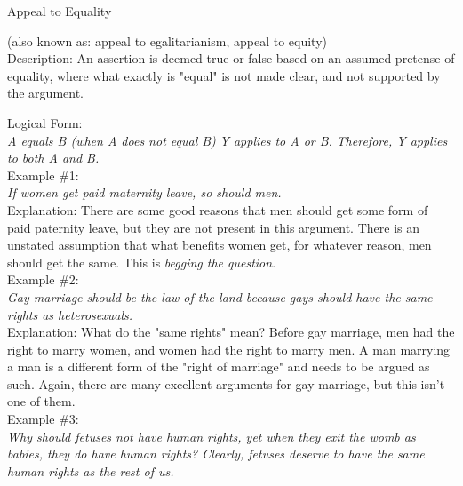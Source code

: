 \documentclass[a4paper,12pt,single,pdftex]{scrbook}
\begin{document}
Appeal to Equality
    
      (also known as: appeal to egalitarianism, appeal to equity)
    \\

  
    Description: An assertion is deemed true or false based on an assumed pretense of equality, where what exactly is "equal" is not made clear, and not supported by the argument.

    
      Logical Form:
    \\

    
      {\em A equals B (when A does not equal B)} \newline
{\em Y applies to A or B.} \newline
{\em Therefore, Y applies to both A and B.}
    \\

    
      Example \#1:
    \\

    
      {\em If women get paid maternity leave, so should men.}
    \\

    
      Explanation: There are some good reasons that men should get some form of paid paternity leave, but they are not present in this argument. There is an unstated assumption that what benefits women get, for whatever reason, men should get the same. This is {\it begging the question}.
    \\

    
      Example \#2:
    \\

    
      {\em Gay marriage should be the law of the land because gays should have the same rights as heterosexuals.}
    \\

    
      Explanation: What do the "same rights" mean? Before gay marriage, men had the right to marry women, and women had the right to marry men. A man marrying a man is a different form of the "right of marriage" and needs to be argued as such. Again, there are many excellent arguments for gay marriage, but this isn't one of them.
    \\

    
      Example \#3:
    \\

    
      {\em Why should fetuses not have human rights, yet when they exit the womb as babies, they do have human rights? Clearly, fetuses deserve to have the same human rights as the rest of us.}
    \\
\end{document}
